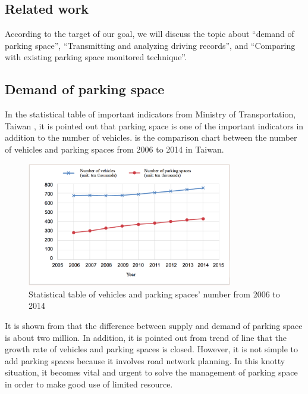 \documentclass[runningheads,a4paper]{llncs}
\begin{document}
\begin{CJK}{UTF8}{bsmi}
\section{Related work}\label{sec:relatedWork}

According to the target of our goal, we will discuss the topic about
``demand of parking space'', ``Transmitting and analyzing driving records'',
and ``Comparing with existing parking space monitored technique''.

%
\subsection{Demand of parking space}
%

In the statistical table of important indicators from Ministry of
Transportation, Taiwan \cite{motc}, it is pointed out that parking space is one
of the important indicators in addition to the number of vehicles.
 is the comparison chart between the number of vehicles and
parking spaces from 2006 to 2014 in Taiwan.

\begin{figure}
\begin{center}
\includegraphics[width=0.8\textwidth]{Figures/Statistical_Table.png}
\end{center}
\caption{Statistical table of vehicles and parking spaces' number from
2006 to 2014}
\label{fig:StatisticalTable}
\end{figure}

It is shown from  that the difference between supply and demand
of parking space is about two million. In addition, it is pointed out
from trend of line that the growth rate of vehicles and parking spaces
is closed. However, it is not simple to add parking spaces because it
involves road network planning. In this knotty situation, it becomes
vital and urgent to solve the management of parking space in order to
make good use of limited resource.


\end{CJK}
\end{document}
